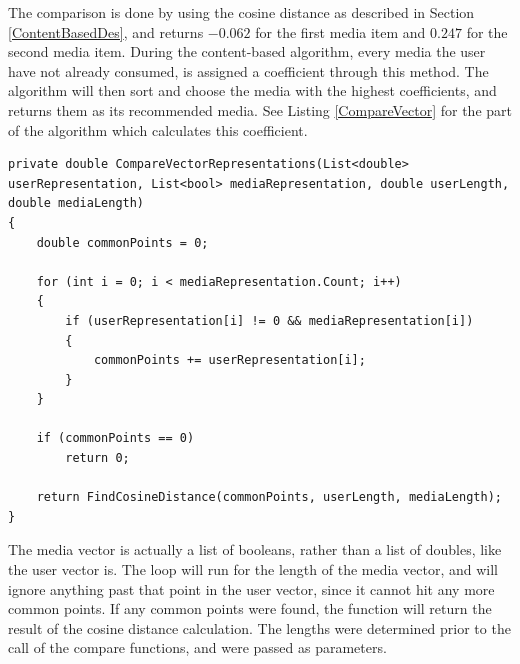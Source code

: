The comparison is done by using the cosine distance as described in Section \ref{ContentBasedDes}, and returns $-0.062$ for the first media item and $0.247$ for the second media item. During the content-based algorithm, every media the user have not already consumed, is assigned a coefficient through this method. The algorithm will then sort and choose the media with the highest coefficients, and returns them as its recommended media. See Listing \ref{CompareVector} for the part of the algorithm which calculates this coefficient.

\begin{lstlisting}[caption={The CompareVectorRepresentations method},label={CompareVector}]
private double CompareVectorRepresentations(List<double> userRepresentation, List<bool> mediaRepresentation, double userLength, double mediaLength)
{
	double commonPoints = 0;

	for (int i = 0; i < mediaRepresentation.Count; i++)
	{
		if (userRepresentation[i] != 0 && mediaRepresentation[i])
		{
			commonPoints += userRepresentation[i];
		}
	}

	if (commonPoints == 0)
		return 0;

	return FindCosineDistance(commonPoints, userLength, mediaLength);
}
\end{lstlisting}

The media vector is actually a list of booleans, rather than a list of doubles, like the user vector is. The loop will run for the length of the media vector, and will ignore anything past that point in the user vector, since it cannot hit any more common points. If any common points were found, the function will return the result of the cosine distance calculation. The lengths were determined prior to the call of the compare functions, and were passed as parameters.